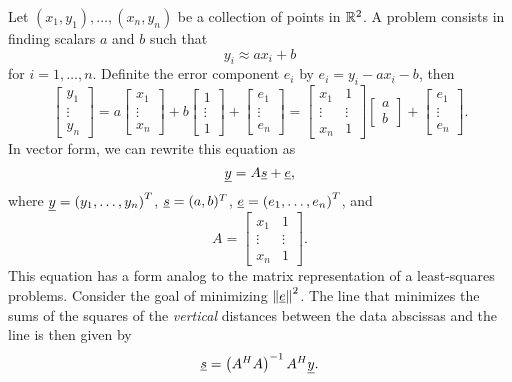 Let $(x_1, y_1), \ldots, (x_n, y_n)$ be a collection of points in $\mathbb{R}^2$.
A  problem consists in finding scalars $a$ and $b$ such that
\begin{equation*}
y_i \approx a x_i + b
\end{equation*}
for $i = 1, \ldots, n$.
Definite the error component $e_i$ by $e_i = y_i - a x_i - b$, then
\begin{equation*}
\left[ \begin{array}{c} y_1 \\ \vdots \\ y_n \end{array} \right]
= a \left[ \begin{array}{c} x_1 \\ \vdots \\ x_n \end{array} \right]
+ b \left[ \begin{array}{c} 1 \\ \vdots \\ 1 \end{array} \right]
+ \left[ \begin{array}{c} e_1 \\ \vdots \\ e_n \end{array} \right]
= \left[ \begin{array}{cc} x_1 & 1 \\
\vdots & \vdots \\ x_n & 1 \end{array} \right]
\left[ \begin{array}{c} a \\ b \end{array} \right]
+ \left[ \begin{array}{c} e_1 \\ \vdots \\ e_n \end{array} \right] .
\end{equation*}
In vector form, we can rewrite this equation as
\begin{equation*}
\underline{y} = A \underline{s} + \underline{e},
\end{equation*}
where $\underline{y} = \left( y_1, \ldots, y_n \right)^T$, $\underline{s} = (a, b)^T$, $\underline{e} = \left( e_1, \ldots, e_n \right)^T$, and
\begin{equation*}
A = \left[ \begin{array}{cc} x_1 & 1 \\
\vdots & \vdots \\ x_n & 1 \end{array} \right] .
\end{equation*}
This equation has a form analog to the matrix representation of a least-squares problems.
Consider the goal of minimizing $\left\| \underline{e} \right\|^2$.
The line that minimizes the sums of the squares of the \emph{vertical} distances between the data abscissas and the line is then given by
\begin{equation*}
\underline{s} = \left( A^H A \right)^{-1} A^H \underline{y} .
\end{equation*}


